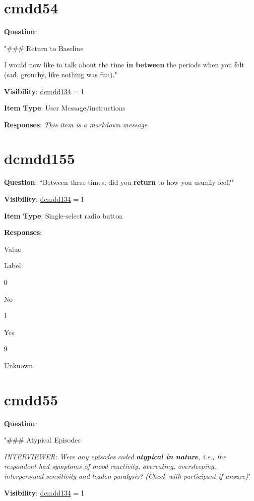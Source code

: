 \documentclass[
]{book}
\begin{document}
\hypertarget{cmdd54}{%
\section{cmdd54}\label{cmdd54}}

\textbf{Question}:

"\#\#\# Return to Baseline

I would now like to talk about the time \textbf{in between} the periods when you felt (sad, grouchy, like nothing was fun)."

\textbf{Visibility}: \protect\hyperlink{dcmdd134}{dcmdd134} = 1

\textbf{Item Type}: User Message/instructions

\textbf{Responses}: \emph{This item is a markdown message}

\hypertarget{dcmdd155}{%
\section{dcmdd155}\label{dcmdd155}}

\textbf{Question}: ``Between these times, did you \textbf{return} to how you usually feel?''

\textbf{Visibility}: \protect\hyperlink{dcmdd134}{dcmdd134} = 1

\textbf{Item Type}: Single-select radio button

\textbf{Responses}:

Value

Label

0

No

1

Yes

9

Unknown

\hypertarget{cmdd55}{%
\section{cmdd55}\label{cmdd55}}

\textbf{Question}:

"\#\#\# Atypical Episodes

\emph{INTERVIEWER: Were any episodes coded \textbf{atypical in nature}, i.e., the respondent had symptoms of mood reactivity, overeating, oversleeping, interpersonal sensitivity and leaden paralysis? (Check with participant if unsure)}"

\textbf{Visibility}: \protect\hyperlink{dcmdd134}{dcmdd134} = 1
\end{document}
